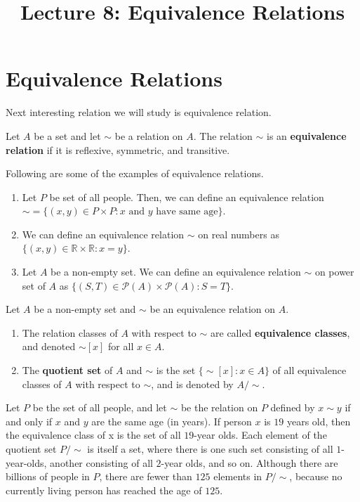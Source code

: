 \documentclass[a4paper,english,12pt]{article}
\title{Lecture 8: Equivalence Relations}
\author{}
\begin{document}
\maketitle

\section{Equivalence Relations}
Next interesting relation we will study is equivalence relation.
\begin{defn} Let $A$ be a set and let $\sim$ be a relation on $A$. The relation $\sim$ is an \textbf{equivalence relation} if it is reflexive, symmetric, and transitive.
\end{defn}
\begin{exmp} Following are some of the examples of equivalence relations.
	\begin{enumerate}
		\item Let $P$ be set of all people. Then, we can define an equivalence relation $\sim =\{(x,y) \in P \times P: x \text{ and } y \text{ have same age} \}$.
		\item We can define an equivalence relation $\sim$ on real numbers as $\{(x,y) \in \mathbb{R}\times \mathbb{R}: x = y\}$. 
		\item Let $A$ be a non-empty set. We can define an equivalence relation $\sim$ on power set of $A$ as $\{(S,T) \in \mathcal{P}(A)\times \mathcal{P}(A): S = T\}$. 
	\end{enumerate}
\end{exmp}
\begin{defn} Let $A$ be a non-empty set and $\sim$ be an equivalence relation on $A$. 
	\begin{enumerate}
		\item The relation classes of $A$ with respect to $\sim$ are called \textbf{equivalence classes}, and denoted $\sim[x]$ for all $x \in A$.
		\item The \textbf{quotient set} of $A$ and $\sim$ is the set $\{\sim[x]: x \in A\}$ of all equivalence classes of $A$ with respect to $\sim$, %
		and is denoted by $A/\sim$.
	\end{enumerate}
\end{defn}

\begin{exmp} Let $P$ be the set of all people, and let $\sim$ be the relation on $P$ defined by $x \sim y$ if and only if $x$ and $y$ are the same age (in years). If person $x$ is $19$ years old, then the equivalence class of x is the set of all $19$-year olds. Each element of the quotient set $P/\sim$ is itself a set, where there is one such set consisting of all $1$-year-olds, another consisting of all $2$-year olds, and so on. Although there are billions of
people in $P$, there are fewer than $125$ elements in $P/\sim$, because no currently living person has reached the age of $125$.
\end{exmp}
\end{document}
